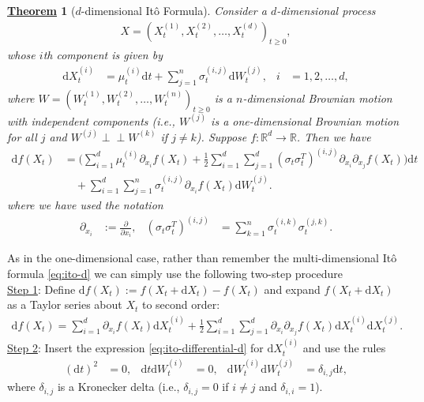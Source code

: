 \documentclass[12pt]{book}
\numberwithin{equation}{chapter}
\theoremstyle{plain}
\newtheorem{theorem}{\underline{Theorem}}
\numberwithin{theorem}{section}
\theoremstyle{definition}
\numberwithin{exercise}{chapter}
\newcommand{\<}{\langle}
\renewcommand{\>}{\rangle}
\renewcommand{\(}{\left(}
\renewcommand{\)}{\right)}
\renewcommand{\[}{\left[}
\renewcommand{\]}{\right]}
\newcommand\Rb{\mathds{R}}
\newcommand\sig{\sigma}
\newcommand\del{\delta}
\renewcommand\d{\partial}
\newcommand{\ind}{\perp \! \! \! \perp}
\newcommand\dd{\mathrm{d}}
\theoremstyle{definition}
\numberwithin{question}{section}
\begin{document}
\begin{theorem}[$d$-dimensional It\^o Formula]
Consider a $d$-dimensional process 
\begin{align}
X 
	= (X_t^{(1)}, X_t^{(2)}, \ldots, X_t^{(d)})_{t \geq 0}, 
\end{align}
whose $i$th component is given by
\begin{align}
\dd X_t^{(i)}
	&=	\mu_t^{(i)} \dd t + \sum_{j=1}^n \sig_t^{(i,j)} \dd W_t^{(j)} , &
i
	&=	1, 2, \ldots, d , \label{eq:ito-differential-d}
\end{align}
where $W = (W_t^{(1)}, W_t^{(2)}, \ldots, W_t^{(n)})_{t \geq 0}$ is a $n$-dimensional Brownian motion with independent components (i.e., $W^{(j)}$ is a one-dimensional Brownian motion for all $j$ and $W^{(j)} \ind W^{(k)}$ if $j \neq k$).  Suppose $f: \Rb^d \to \Rb$.  Then we have
\begin{align}
\dd f(X_t)
	&=	\Big( \sum_{i=1}^d \mu_t^{(i)} \d_{x_i} f(X_t)  + \frac{1}{2} \sum_{i=1}^d \sum_{j=1}^d (\sig_t \sig_t^T)^{(i,j)} \d_{x_i} \d_{x_j} f(X_t) \Big) \dd t \\ & \quad
			+ \sum_{i=1}^d \sum_{j=1}^n \sig_t^{(i,j)} \d_{x_i} f(X_t) \dd W_t^{(j)} . \label{eq:ito-d}
\end{align}
where we have used the notation
\begin{align}
\d_{x_i} 
	&:= \frac{\d}{\d x_i} , &
(\sig_t \sig_t^T)^{(i,j)}
	&=	\sum_{k=1}^n \sig_t^{(i,k)} \sig_t^{(j,k)} .
\end{align}
\end{theorem}

\noindent
As in the one-dimensional case, rather than remember the multi-dimensional It\^o formula \eqref{eq:ito-d} we can simply use the following two-step procedure
\\[0.5em]
\underline{Step 1}: Define $\dd f(X_t) := f(X_t + \dd X_t) - f(X_t)$ and expand $f(X_t + \dd X_t)$ as a Taylor series about $X_t$ to second order:
\begin{align}
\dd f(X_t) = \sum_{i=1}^d \d_{x_i}f(X_t) \dd X_t^{(i)} + \frac{1}{2} \sum_{i=1}^d \sum_{j=1}^d \d_{x_i} \d_{x_j} f(X_t) \dd X_t^{(i)} \dd X_t^{(j)} . \label{eq:taylor-d}
\end{align}
\underline{Step 2}: Insert the expression \eqref{eq:ito-differential-d} for $\dd X_t^{(i)}$ and use the rules 
\begin{align}
(\dd t)^2 &= 0, &
\dd t \dd W_t^{(i)} &= 0, &
\dd W_t^{(i)} \dd W_t^{(j)} &= \del_{i,j} \dd t , \label{eq:rules-d}
\end{align}
where $\del_{i,j}$ is a Kronecker delta (i.e., $\del_{i,j} = 0$ if $i \neq j$ and $\del_{i,i} = 1$).  
\end{document}
